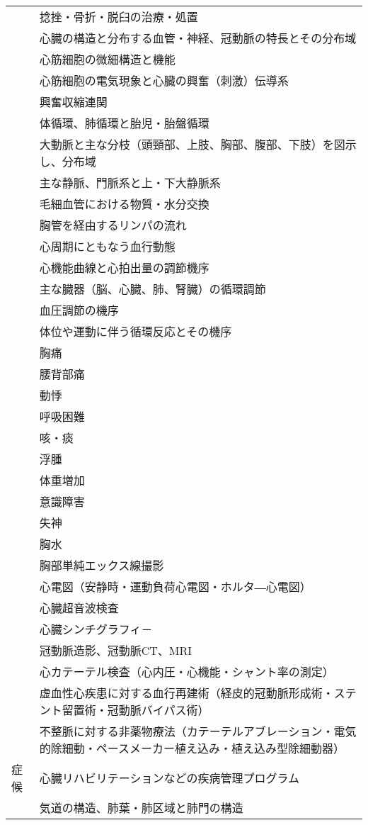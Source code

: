 \begin{xltabular}{\linewidth}{XX}
 & 捻挫・骨折・脱臼の治療・処置 \\
 & 心臓の構造と分布する血管・神経、冠動脈の特長とその分布域 \\
 & 心筋細胞の微細構造と機能 \\
 & 心筋細胞の電気現象と心臓の興奮（刺激）伝導系 \\
 & 興奮収縮連関 \\
 & 体循環、肺循環と胎児・胎盤循環 \\
 & 大動脈と主な分枝（頭頸部、上肢、胸部、腹部、下肢）を図示し、分布域 \\
 & 主な静脈、門脈系と上・下大静脈系 \\
 & 毛細血管における物質・水分交換 \\
 & 胸管を経由するリンパの流れ \\
 & 心周期にともなう血行動態 \\
 & 心機能曲線と心拍出量の調節機序 \\
 & 主な臓器（脳、心臓、肺、腎臓）の循環調節 \\
 & 血圧調節の機序 \\
 & 体位や運動に伴う循環反応とその機序 \\
 & 胸痛 \\
 & 腰背部痛 \\
 & 動悸 \\
 & 呼吸困難 \\
 & 咳・痰 \\
 & 浮腫 \\
 & 体重増加 \\
 & 意識障害 \\
 & 失神 \\
 & 胸水 \\
 & 胸部単純エックス線撮影 \\
 & 心電図（安静時・運動負荷心電図・ホルタ―心電図） \\
 & 心臓超音波検査 \\
 & 心臓シンチグラフィ－ \\
 & 冠動脈造影、冠動脈CT、MRI \\
 & 心カテーテル検査（心内圧・心機能・シャント率の測定） \\
 & 虚血性心疾患に対する血行再建術（経皮的冠動脈形成術・ステント留置術・冠動脈バイパス術） \\
 & 不整脈に対する非薬物療法（カテーテルアブレーション・電気的除細動・ペースメーカー植え込み・植え込み型除細動器） \\
症候 & 心臓リハビリテーションなどの疾病管理プログラム \\
 & 気道の構造、肺葉・肺区域と肺門の構造 \\

\end{xltabular}
